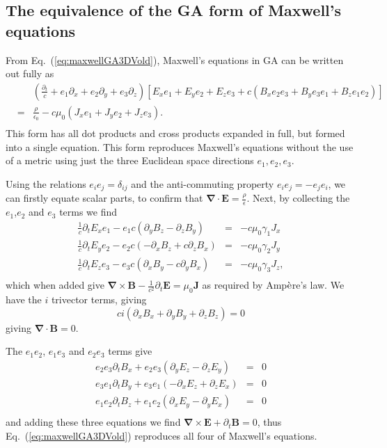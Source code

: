 \documentclass[12pt,aps,prb,preprint]{revtex4}   %
\newcommand{\be}{\begin{equation}}
\newcommand{\ee}{\end{equation}}
\newcommand{\bea}{\begin{eqnarray}}
\newcommand{\eea}{\end{eqnarray}}
\newcommand{\iGA}{{i}}
\begin{document}
\subsection{The equivalence of the GA form of Maxwell's equations}

From Eq.~(\ref{eq:maxwellGA3DVold}), Maxwell's equations in GA can be written out fully as
\bea \label{eq:maxwellGASISimpleFinalAppendix}
& & \left (\frac{\partial_t}{c}  + e_1 \partial_x+ e_2 \partial_y+ e_3 \partial_z \right ) \left [E_x e_1 + E_y e_2 + E_z e_3  + c \left ( B_x e_2 e_3+ B_y e_3 e_1 + B_z e_1 e_2 \right ) \right ] \\ \nonumber
& = & \frac{\rho}{ \epsilon_0 }   - c \mu_0 \left (J_x e_1 + J_y e_2 + J_z e_3 \right ). \\ \nonumber
\eea
This form has all dot products and cross products expanded in full, but formed into a single equation.
This form reproduces Maxwell's equations without the use of a metric using just the three Euclidean space directions $ e_1,e_2,e_3 $.  

Using the relations $ e_i e_j = \delta_{ij} $ and  the anti-commuting property $ e_i e_j = - e_j e_i  $, we can firstly equate scalar parts, to confirm that $ \mathbf{\nabla} \cdot \mathbf{E}  = \frac{\rho}{\epsilon} $.  Next, by collecting the $ e_1 $,$ e_2 $ and $ e_3 $ terms we find
\bea
  \frac{1}{c } \partial_t E_x e_1 - e_1 c (\partial_y B_z - \partial_z B_y)   & = &  -c \mu_0 \gamma_1 J_x  \\ \nonumber
  \frac{1}{c } \partial_t E_y e_2 - e_2 c ( -\partial_x B_z + c\partial_z B_x)   & = & - c \mu_0 \gamma_2 J_y  \\ \nonumber
  \frac{1}{c } \partial_t E_z e_3 - e_3 c (\partial_x B_y - c\partial_y B_x)   & = &  - c \mu_0 \gamma_3 J_z,  \\ \nonumber
\eea
which when added give $  \mathbf{\nabla} \times \mathbf{B} - \frac{1}{c^2 } \partial_t \mathbf{E} =   \mu_0 \mathbf{J} $ as required by Amp$\grave{\rm{e}}$re's law.
We have the $ \iGA $ trivector terms, giving
\be
c \iGA (\partial_x B_x+\partial_y B_y+\partial_z B_z) = 0 
\ee
giving $  \mathbf{\nabla} \cdot \mathbf{B}  = 0 $.  

The $  e_1 e_2 $, $   e_1 e_3  $ and $  e_2 e_3  $ terms give
\bea
 e_2 e_3 \partial_t B_x  + e_2 e_3 ( \partial_y E_z - \partial_z E_y)  & = & 0 \\ \nonumber
 e_3 e_1  \partial_t B_y  +   e_3 e_1   ( -\partial_x E_z + \partial_z E_x )  & = & 0 \\ \nonumber
  e_1 e_2 \partial_t B_z  +  e_1 e_2  ( \partial_x E_y - \partial_y E_x )  & = & 0  \\ \nonumber
\eea
and adding these three equations we find $ \mathbf{\nabla} \times \mathbf{E}+ \partial_t \mathbf{B} = 0 $,
thus Eq.~(\ref{eq:maxwellGA3DVold}) reproduces all four of Maxwell's equations.
\end{document}
